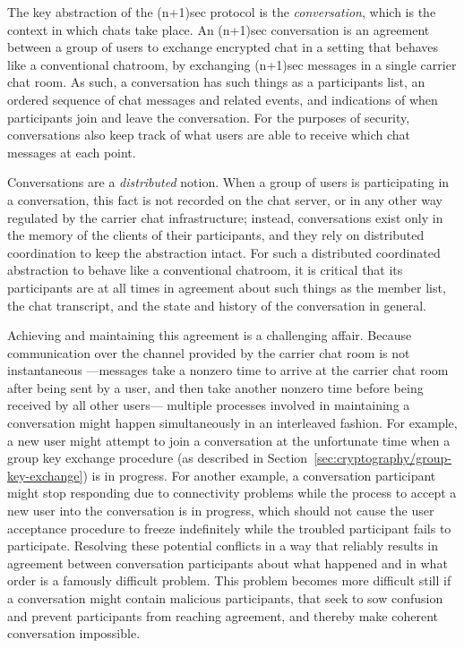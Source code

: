 \documentclass{article}
\begin{document}
The key abstraction of the (n+1)sec protocol is the \emph{conversation}, which is the context in which chats take place.
An (n+1)sec conversation is an agreement between a group of users to exchange encrypted chat in a setting that behaves like a conventional chatroom, by exchanging (n+1)sec messages in a single carrier chat room.
As such, a conversation has such things as a participants list, an ordered sequence of chat messages and related events, and indications of when participants join and leave the conversation.
For the purposes of security, conversations also keep track of what users are able to receive which chat messages at each point.

Conversations are a \emph{distributed} notion.
When a group of users is participating in a conversation, this fact is not recorded on the chat server, or in any other way regulated by the carrier chat infrastructure; instead, conversations exist only in the memory of the clients of their participants, and they rely on distributed coordination to keep the abstraction intact.
For such a distributed coordinated abstraction to behave like a conventional chatroom, it is critical that its participants are at all times in agreement about such things as the member list, the chat transcript, and the state and history of the conversation in general.

Achieving and maintaining this agreement is a challenging affair.
Because communication over the channel provided by the carrier chat room is not instantaneous ---messages take a nonzero time to arrive at the carrier chat room after being sent by a user, and then take another nonzero time before being received by all other users--- multiple processes involved in maintaining a conversation might happen simultaneously in an interleaved fashion.
For example, a new user might attempt to join a conversation at the unfortunate time when a group key exchange procedure (as described in Section~\ref{sec:cryptography/group-key-exchange}) is in progress.
For another example, a conversation participant might stop responding due to connectivity problems while the process to accept a new user into the conversation is in progress, which should not cause the user acceptance procedure to freeze indefinitely while the troubled participant fails to participate.
Resolving these potential conflicts in a way that reliably results in agreement between conversation participants about what happened and in what order is a famously difficult problem.
This problem becomes more difficult still if a conversation might contain malicious participants, that seek to sow confusion and prevent participants from reaching agreement, and thereby make coherent conversation impossible.
\end{document}
